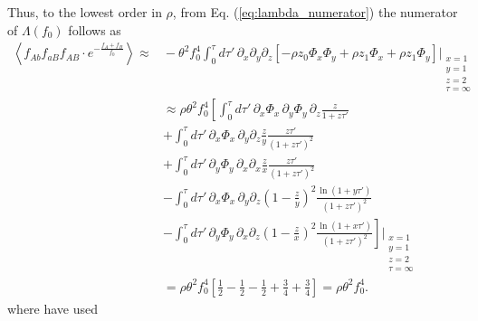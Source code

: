 \documentclass[11pt]{article}
\begin{document}
Thus, to the lowest order in $\rho$, from Eq. (\ref{eq:lambda_numerator}) the numerator of $\Lambda(f_0)$ follows as
\begin{align}\label{eq:lambda_num_contribution}
    \left\langle f_{Ab}f_{aB}f_{AB}\cdot e^{-\frac{f_{A}+f_{B}}{f_0}}\right\rangle \approx&{} 
    -\theta^2 f_0^4 \int_0^{\tau} d\tau'\, \partial_x\partial_y\partial_z \left[-\rho z_0\Phi_x\Phi_y + \rho z_1\Phi_x + \rho z_1\Phi_y\right]\Bigg\vert_{\substack{x=1 \\ y=1 \\ z=2 \\ \tau=\infty}} \\ \nonumber
    &\approx \rho \theta^2 f_0^4 \left[
    \int_0^{\tau} d\tau'\, \partial_x \Phi_x \, \partial_y \Phi_y \, \partial_z \frac{z}{1+z\tau'} \right. \\\nonumber
    &+ \left. \int_0^{\tau} d\tau'\, \partial_x \Phi_x \, \partial_y \partial_z \frac{z}{y} \frac{z\tau'}{(1+z\tau')^2} \right. \\\nonumber
    &+ \left. \int_0^{\tau} d\tau'\, \partial_y \Phi_y \, \partial_x \partial_x \frac{z}{x} \frac{z\tau'}{(1+z\tau')^2} \right. \\\nonumber
    &- \left. \int_0^{\tau} d\tau'\, \partial_x \Phi_x \, \partial_y \partial_z \left(1-\frac{z}{y}\right)^2 \frac{\ln(1+y\tau')}{(1+z\tau')^2} \right. \\\nonumber
    &- \left. \int_0^{\tau} d\tau'\, \partial_y \Phi_y \, \partial_x \partial_z \left(1-\frac{z}{x}\right)^2 \frac{\ln(1+x\tau')}{(1+z\tau')^2} 
    \right]\Bigg\vert_{\substack{x=1 \\ y=1 \\ z=2 \\ \tau=\infty}} \\ \nonumber
    &= \rho \theta^2 f_0^4 \left[\frac{1}{2} -\frac{1}{2} -\frac{1}{2} +\frac{3}{4} +\frac{3}{4}\right] = \rho \theta^2 f_0^4.
\end{align}
where have used
\end{document}
